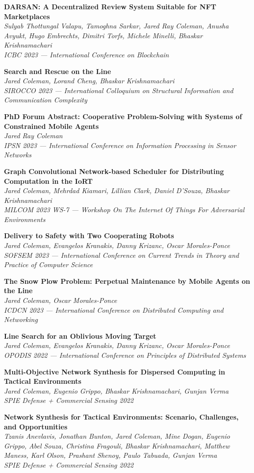 \documentclass[letterpaper,11pt]{article}
\newcommand{\pub}[3]{
  \vspace{-1pt}\item \textbf{#1} \\ 
    \textit{\small#2} \\
    \textit{\small#3}\vspace{-5pt}
}
\begin{document}
    \pub
    {DARSAN: A Decentralized Review System Suitable for NFT Marketplaces}
    {Sulyab Thottungal Valapu, Tamoghna Sarkar, Jared Ray Coleman, Anusha Avyukt, Hugo Embrechts, Dimitri Torfs, Michele Minelli, Bhaskar Krishnamachari}
    {ICBC 2023 --- International Conference on Blockchain}

    \pub
    {Search and Rescue on the Line}
    {Jared Coleman, Lorand Cheng, Bhaskar Krishnamachari}
    {SIROCCO 2023 --- International Colloquium on Structural Information and Communication Complexity}

    \pub
    {PhD Forum Abstract: Cooperative Problem-Solving with Systems of Constrained Mobile Agents}
    {Jared Ray Coleman}
    {IPSN 2023 --- International Conference on Information Processing in Sensor Networks}

    \pub
    {Graph Convolutional Network-based Scheduler for Distributing Computation in the IoRT}
    {Jared Coleman, Mehrdad Kiamari, Lillian Clark, Daniel D'Souza, Bhaskar Krishnamachari}
    {MILCOM 2023 WS-7 --- Workshop On The Internet Of Things For Adversarial Environments}

    \pub
    {Delivery to Safety with Two Cooperating Robots}
    {Jared Coleman, Evangelos Kranakis, Danny Krizanc, Oscar Morales-Ponce}
    {SOFSEM 2023 --- International Conference on Current Trends in Theory and Practice of Computer Science}

    \pub
    {The Snow Plow Problem: Perpetual Maintenance by Mobile Agents on the Line}
    {Jared Coleman, Oscar Morales-Ponce}
    {ICDCN 2023 --- International Conference on Distributed Computing and Networking}

    \pub
    {Line Search for an Oblivious Moving Target}
    {Jared Coleman, Evangelos Kranakis, Danny Krizanc, Oscar Morales-Ponce}
    {OPODIS 2022 --- International Conference on Principles of Distributed Systems}

    \pub
    {Multi-Objective Network Synthesis for Dispersed Computing in Tactical Environments}
    {Jared Coleman, Eugenio Grippo, Bhaskar Krishnamachari, Gunjan Verma}
    {SPIE Defense + Commercial Sensing 2022}

    \pub
    {Network Synthesis for Tactical Environments: Scenario, Challenges, and Opportunities}
    {Tzanis Anevlavis, Jonathan Bunton, Jared Coleman, Mine Dogan, Eugenio Grippo, Abel Souza, Christina Fragouli, Bhaskar Krishnamachari, Matthew Maness, Karl Olson, Prashant Shenoy, Paulo Tabuada, Gunjan Verma}
    {SPIE Defense + Commercial Sensing 2022}
\end{document}
